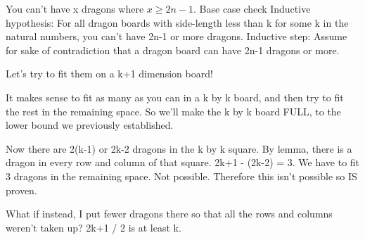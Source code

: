 \documentclass[11pt,letterpaper]{article}
\begin{document}
You can't have x dragons where $x \geq 2n-1$.
Base case check
Inductive hypothesis:
For all dragon boards with side-length less than k for some k in the natural numbers, you can't have 2n-1 or more dragons.
Inductive step:
Assume for sake of contradiction that a dragon board can have 2n-1 dragons or more. 

Let's try to fit them on a k+1 dimension board!

It makes sense to fit as many as you can in a k by k board, and then try to fit the rest in the remaining space. So we'll make the k by k board FULL, to the lower bound we previously established.

Now there are 2(k-1) or 2k-2 dragons in the k by k square. By lemma, there is a dragon in every row and column of that square. 2k+1 - (2k-2) = 3. We have to fit 3 dragons in the remaining space. Not possible. Therefore this isn't possible so IS proven.

What if instead, I put fewer dragons there so that all the rows and columns weren't taken up? 2k+1 / 2 is at least k.
\end{document}
